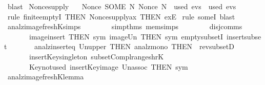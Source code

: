 \begin{isabellebody}
  \isadelimproof
  \endisadelimproof
  \isatagproof
  \isamarkupfalse%
  \ blast%
  \endisatagproof
  {\isafoldproof}%
  \isadelimproof
  \isanewline
  \endisadelimproof
  \isanewline
  \isanewline
  \isamarkupfalse%
  \ Nonce{\isacharunderscore}supply\ {\isacharcolon}\isanewline
  \ \ {\isachardoublequoteopen}Nonce\ {\isacharparenleft}SOME\ N{\isachardot}\ Nonce\ N\ {\isasymnotin}\ used\ evs{\isacharparenright}\ {\isasymnotin}\ used\ evs{\isachardoublequoteclose}\isanewline
  \isadelimproof
  \endisadelimproof
  \isatagproof
  \isamarkupfalse%
  \ {\isacharparenleft}rule\ finite{\isachardot}emptyI\ {\isacharbrackleft}THEN\ Nonce{\isacharunderscore}supply{\isacharunderscore}ax{\isacharcomma}\ THEN\ exE{\isacharbrackright}{\isacharparenright}\isanewline
  \isamarkupfalse%
  \ {\isacharparenleft}rule\ someI{\isacharcomma}\ blast{\isacharparenright}\isanewline
  \isamarkupfalse%
  \endisatagproof
  {\isafoldproof}%
  \isadelimproof
  \isanewline
  \endisadelimproof
  \isanewline
  \isamarkupfalse%
  \ analz{\isacharunderscore}image{\isacharunderscore}freshK{\isacharunderscore}simps\ {\isacharequal}\isanewline
  \ \ \ \ \ \ \ simp{\isacharunderscore}thms\ mem{\isacharunderscore}simps\ %
  \isanewline
  \ \ \ \ \ \ \ disj{\isacharunderscore}comms\ \isanewline
  \ \ \ \ \ \ \ image{\isacharunderscore}insert\ {\isacharbrackleft}THEN\ sym{\isacharbrackright}\ image{\isacharunderscore}Un\ {\isacharbrackleft}THEN\ sym{\isacharbrackright}\ empty{\isacharunderscore}subsetI\ insert{\isacharunderscore}subset\isanewline
  \ \ \ \ \ \ \ analz{\isacharunderscore}insert{\isacharunderscore}eq\ Un{\isacharunderscore}upper{}\ {\isacharbrackleft}THEN\ analz{\isacharunderscore}mono{\isacharcomma}\ THEN\ {\isacharbrackleft}{}{\isacharbrackright}\ rev{\isacharunderscore}subsetD{\isacharbrackright}\isanewline
  \ \ \ \ \ \ \ insert{\isacharunderscore}Key{\isacharunderscore}singleton\ subset{\isacharunderscore}Compl{\isacharunderscore}range{\isacharunderscore}shrK\isanewline
  \ \ \ \ \ \ \ Key{\isacharunderscore}not{\isacharunderscore}used\ insert{\isacharunderscore}Key{\isacharunderscore}image\ Un{\isacharunderscore}assoc\ {\isacharbrackleft}THEN\ sym{\isacharbrackright}\isanewline
  \isanewline
  \isanewline
  \isamarkupfalse%
  \ analz{\isacharunderscore}image{\isacharunderscore}freshK{\isacharunderscore}lemma{\isacharcolon}\isanewline

\end{isabellebody}
